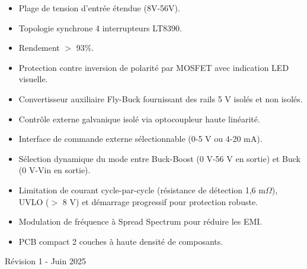 \begin{titlepage}
\begin{minipage}[t]{0.48\textwidth}
	\begin{itemize}[leftmargin=0pt,labelsep=5pt]
		\item Plage de tension d'entrée étendue (8V-56V).
		\item Topologie synchrone 4 interrupteurs LT8390.
		\item Rendement $>$ 93\%.
		\item Protection contre inversion de polarité par MOSFET avec indication LED visuelle.
		\item Convertisseur auxiliaire Fly-Buck fournissant des rails 5 V isolés et non isolés.
		\item Contrôle externe galvanique isolé via optocoupleur haute linéarité.
		\item Interface de commande externe sélectionnable (0-5 V ou 4-20 mA).
		\item Sélection dynamique du mode entre Buck-Boost (0 V-56 V en sortie) et Buck (0 V-Vin en sortie).
		\item Limitation de courant cycle-par-cycle (résistance de détection 1,6 m$\Omega$), UVLO ($>$ 8 V) et démarrage progressif pour protection robuste.
		\item Modulation de fréquence à Spread Spectrum pour réduire les EMI.
		\item PCB compact 2 couches à haute densité de composants.
	\end{itemize}
	\end{minipage}


    \vfill

    \noindent
    \begin{minipage}[t]{0.48\textwidth}
      \footnotesize Révision 1 - Juin 2025 \\
    \end{minipage}%
    \hfill%
    \begin{minipage}[t]{0.48\textwidth}
      \raggedleft
    \end{minipage}\\[0.5em]

\end{titlepage}
